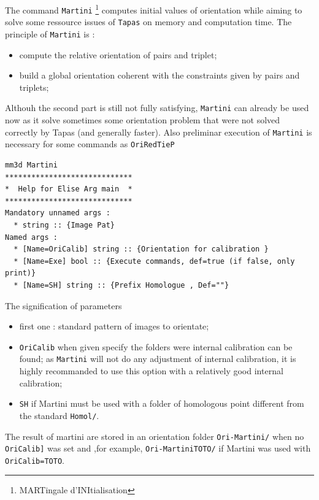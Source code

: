 \label{Ori:Martini}

The command {\tt Martini} \footnote{MARTingale d'INItialisation} computes
 initial values of orientation while
aiming to solve some ressource issues of {\tt Tapas} on memory and computation time. The principle 
of {\tt Martini} is :

\begin{itemize}
   \item  compute the relative orientation of pairs and triplet;
   \item  build a global orientation coherent with the constraints given
          by pairs and triplets;
\end{itemize}

Althouh the second part is still not fully satisfying, {\tt Martini} can 
already be used now as it solve sometimes some
orientation problem that were not solved correctly by Tapas 
(and generally faster).  Also preliminar execution of  {\tt Martini} 
is necessary for some commands as {\tt OriRedTieP}

\begin{verbatim}
mm3d Martini
*****************************
*  Help for Elise Arg main  *
*****************************
Mandatory unnamed args : 
  * string :: {Image Pat}
Named args : 
  * [Name=OriCalib] string :: {Orientation for calibration }
  * [Name=Exe] bool :: {Execute commands, def=true (if false, only print)}
  * [Name=SH] string :: {Prefix Homologue , Def=""}
\end{verbatim}


The signification of parameters 

\begin{itemize}
   \item  first one : standard pattern of images to orientate;
   \item  {\tt OriCalib} when given specify the folders were internal calibration can be found; as {\tt Martini} will
          not do any adjustment of internal calibration, it is highly recommanded to use this option with a 
          relatively good internal calibration;
   \item  {\tt SH} if Martini must be used with a folder of homologous point different from the standard {\tt Homol/}.
\end{itemize}

The result of martini are stored in an orientation folder {\tt Ori-Martini/} when no {\tt OriCalib]} was set and
,for example, {\tt Ori-MartiniTOTO/} if Martini was used with {\tt OriCalib=TOTO}.

